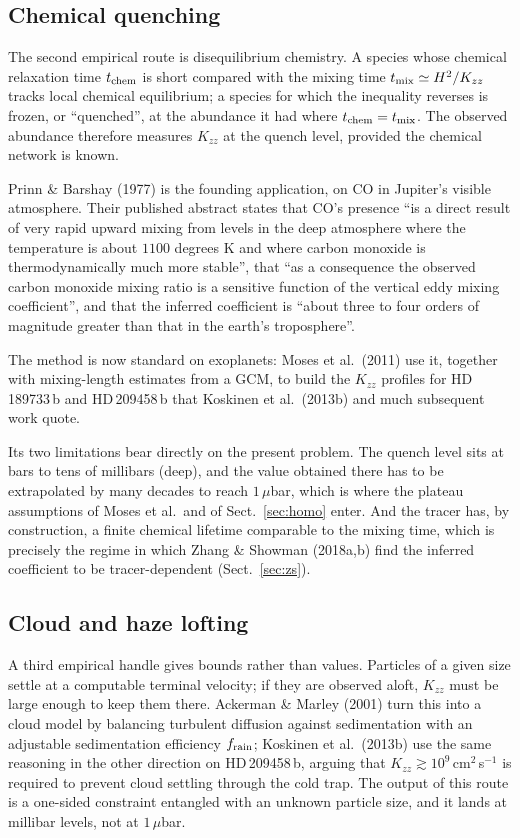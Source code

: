 \documentclass[english,a4paper]{my_memo}
\begin{document}
\subsection{Chemical quenching}
\label{sec:quench}

The second empirical route is disequilibrium chemistry. A species whose
chemical relaxation time $t_{\rm chem}$ is short compared with the mixing
time $t_{\rm mix} \simeq H^{2}/K_{zz}$ tracks local chemical equilibrium; a
species for which the inequality reverses is frozen, or ``quenched'', at the
abundance it had where $t_{\rm chem} = t_{\rm mix}$. The observed abundance
therefore measures $K_{zz}$ at the quench level, provided the chemical
network is known.

Prinn \& Barshay (1977) is the founding application, on CO in Jupiter's
visible atmosphere. Their published abstract states that CO's presence
``is a direct result of very rapid upward mixing from levels in the deep
atmosphere where the temperature is about $1100$ degrees K and where carbon
monoxide is thermodynamically much more stable'', that ``as a consequence
the observed carbon monoxide mixing ratio is a sensitive function of the
vertical eddy mixing coefficient'', and that the inferred coefficient is
``about three to four orders of magnitude greater than that in the earth's
troposphere''.

The method is now standard on exoplanets: Moses et al.\ (2011) use it,
together with mixing-length estimates from a GCM, to build the $K_{zz}$
profiles for HD\,189733\,b and HD\,209458\,b that Koskinen et al.\ (2013b)
and much subsequent work quote.

Its two limitations bear directly on the present problem. The quench level
sits at bars to tens of millibars (deep), and the value obtained there
has to be extrapolated by many decades to reach $1\,\mu$bar, which is where
the plateau assumptions of Moses et al.\ and of Sect.~\ref{sec:homo} enter.
And the tracer has, by construction, a finite chemical lifetime comparable
to the mixing time, which is precisely the regime in which Zhang \& Showman
(2018a,b) find the inferred coefficient to be tracer-dependent
(Sect.~\ref{sec:zs}).

\subsection{Cloud and haze lofting}

A third empirical handle gives bounds rather than values. Particles of a
given size settle at a computable terminal velocity; if they are observed
aloft, $K_{zz}$ must be large enough to keep them there. Ackerman \& Marley
(2001) turn this into a cloud model by balancing turbulent diffusion against
sedimentation with an adjustable sedimentation efficiency $f_{\rm rain}$;
Koskinen et al.\ (2013b) use the same reasoning in the other direction on
HD\,209458\,b, arguing that $K_{zz} \gtrsim 10^{9}$\,cm$^{2}$\,s$^{-1}$ is
required to prevent cloud settling through the cold trap. The output of this
route is a one-sided constraint entangled with an unknown particle size, and
it lands at millibar levels, not at $1\,\mu$bar.
\end{document}
